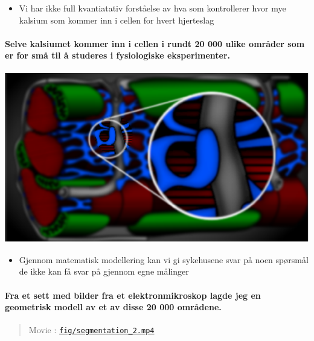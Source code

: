 \documentclass[%
oneside,                 %
final,                   %
10pt]{article}
\newenvironment{doconce:movie}{}{}
\newcounter{doconce:movie:counter}
\begin{document}
\begin{itemize}
\item Vi har ikke full kvantiatativ forståelse av hva som kontrollerer
  hvor mye kalsium som kommer inn i cellen for hvert hjerteslag
\end{itemize}

\noindent
\paragraph{Selve kalsiumet kommer inn i cellen i rundt 20 000 ulike områder som er for små til å studeres i fysiologiske eksperimenter.}
\centerline{\includegraphics[width=0.9\linewidth]{fig/sarcomere_nice_black_blowup.pdf}}



\begin{itemize}
\item Gjennom matematisk modellering kan vi gi sykehusene svar på noen
  spørsmål de ikke kan få svar på gjennom egne målinger
\end{itemize}

\noindent


\paragraph{Fra et sett med bilder fra et elektronmikroskop lagde jeg en geometrisk modell av et av disse 20 000 områdene.}
\begin{doconce:movie}
\begin{quote}
Movie :  \href{run:fig/segmentation_2.mp4}{\nolinkurl{fig/segmentation_2.mp4}}
\end{quote}
\end{doconce:movie}


\end{document}
